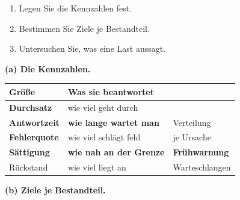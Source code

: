 \begin{aufgabe}
\begin{enumerate}[label=(\alph*)]
\item Legen Sie die Kennzahlen fest.
\item Bestimmen Sie Ziele je Bestandteil.
\item Untersuchen Sie, was eine Last aussagt.
\end{enumerate}

\loesung
\textbf{(a) Die Kennzahlen.}

\begin{center}
{\small
\renewcommand{\arraystretch}{1.45}
\begin{tabular}{@{}P{2.6cm}P{2.8cm}P{2.6cm}@{}}
\toprule
\textbf{Größe} & \textbf{Was sie beantwortet} & \\
\midrule
\textbf{Durchsatz} & wie viel geht durch & \\
\textbf{Antwortzeit} & \textbf{wie lange wartet man} & \textcolor{gruen}{Verteilung}\\
\textbf{Fehlerquote} & wie viel schlägt fehl & \textcolor{gruen}{je Ursache}\\
\textbf{Sättigung} & \textbf{wie nah an der Grenze} & \textcolor{gruen}{\textbf{Frühwarnung}}\\
Rückstand & wie viel liegt an & \textcolor{gruen}{Warteschlangen}\\
\bottomrule
\end{tabular}}
\end{center}

\begin{center}
\begin{minipage}{0.88\textwidth}
\end{minipage}
\end{center}

\begin{center}
\end{center}

\medskip
\textbf{(b) Ziele je Bestandteil.}


\end{aufgabe}
